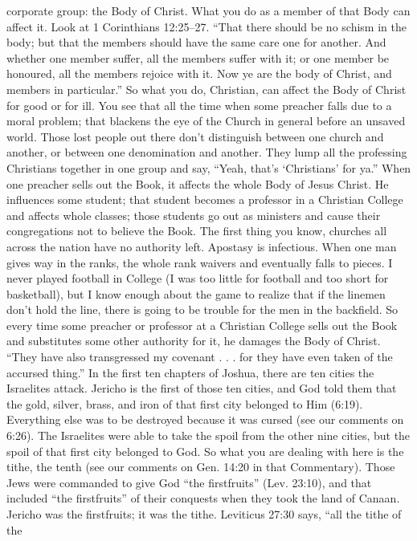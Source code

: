 {corporate group: the Body of Christ. What you
do as a member of that Body can affect it. Look
at 1 Corinthians 12:25–27.
“That there should be no schism in the
body; but that the members should have the
same care one for another. And whether one
member suffer, all the members suffer with
it; or one member be honoured, all the
members rejoice with it. Now ye are the body
of Christ, and members in particular.”
So what you do, Christian, can affect the
Body of Christ for good or for ill. You see that
all the time when some preacher falls due to a
moral problem; that blackens the eye of the
Church in general before an unsaved world.
Those lost people out there don’t distinguish
between one church and another, or between
one denomination and another. They lump all
the professing Christians together in one group
and say, “Yeah, that’s ‘Christians’ for ya.”
When one preacher sells out the Book, it
affects the whole Body of Jesus Christ. He
influences some student; that student becomes a
professor in a Christian College and affects
whole classes; those students go out as ministers
and cause their congregations not to believe the
Book. The first thing you know, churches all
across the nation have no authority left.
Apostasy is infectious.
When one man gives way in the ranks, the
whole rank waivers and eventually falls to
pieces. I never played football in College (I was
too little for football and too short for
basketball), but I know enough about the game
to realize that if the linemen don’t hold the line,
there is going to be trouble for the men in the
backfield. So every time some preacher or
professor at a Christian College sells out the
Book and substitutes some other authority for
it, he damages the Body of Christ.
“They have also transgressed my
covenant . . . for they have even taken of the
accursed thing.” In the first ten chapters of
Joshua, there are ten cities the Israelites attack.
Jericho is the first of those ten cities, and God
told them that the gold, silver, brass, and iron of
that first city belonged to Him (6:19).
Everything else was to be destroyed because it
was cursed (see our comments on 6:26). The
Israelites were able to take the spoil from the
other nine cities, but the spoil of that first city
belonged to God. So what you are dealing with
here is the tithe, the tenth (see our comments on
Gen. 14:20 in that Commentary). Those Jews
were commanded to give God “the firstfruits”
(Lev. 23:10), and that included “the
firstfruits” of their conquests when they took
the land of Canaan. Jericho was the firstfruits;
it was the tithe.
Leviticus 27:30 says, “all the tithe of the
}
